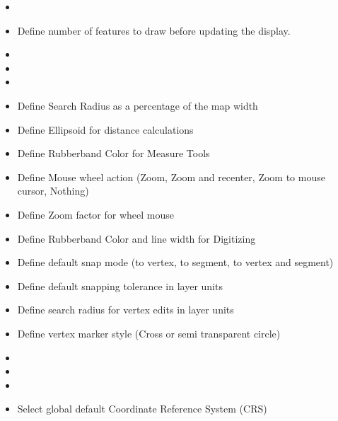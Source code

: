 
\begin{itemize}
\item {}
\item Define number of features to draw before updating the display.
\item {}
\item {}
\item {} 
\end{itemize}


\begin{itemize}
\item Define Search Radius as a percentage of the map width
\item Define Ellipsoid for distance calculations
\item Define Rubberband Color for Measure Tools
\item Define Mouse wheel action (Zoom, Zoom and recenter, Zoom to mouse cursor, Nothing)
\item Define Zoom factor for wheel mouse
\end{itemize}


\begin{itemize}
\item Define Rubberband Color and line width for Digitizing
\item Define default snap mode (to vertex, to segment, to vertex and segment)
\item Define default snapping tolerance in layer units
\item Define search radius for vertex edits in layer units
\item Define vertex marker style (Cross or semi transparent circle)
\end{itemize}


\begin{itemize}
\item {}
\item {}
\item {}
\item Select global default Coordinate Reference System (CRS)
\end{itemize}

